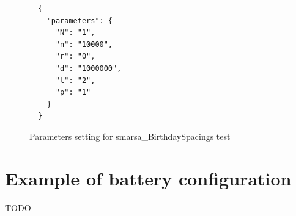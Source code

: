 \documentclass[
  digital,  	%
  color,		%
  oneside,   	%
  12pt,
  nocover,
  notable,
  nolof,
  nolot,
]{fithesis3}
\begin{document}
\begin{description}
\end{description}

\begin{figure}[H]
\begin{verbatim}
  {
    "parameters": {
      "N": "1",
      "n": "10000",
      "r": "0",
      "d": "1000000",
      "t": "2",
      "p": "1"
    }
  }
\end{verbatim}
\caption{Parameters setting for smarsa\_BirthdaySpacings test}
\label{fig:params_tag}
\end{figure}


\chapter{Example of battery configuration}
\label{app:batt_conf_example}
\begin{Huge}
TODO
\end{Huge}
\end{document}
